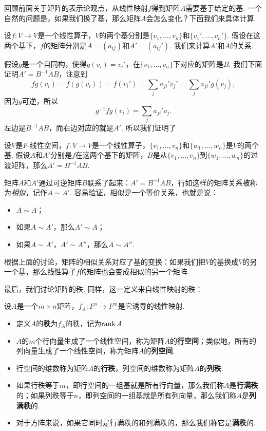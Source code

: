 回顾前面关于矩阵的表示论观点，从线性映射$f$得到矩阵$A$需要基于给定的基. 一个自然的问题是，如果我们换了基，那么矩阵$A$会怎么变化？下面我们来具体计算. 

设$f:V\to V$是一个线性算子，$V$的两个基分别是$\{v_1,\dots,v_n\}$和$\{v_1',\dots,v_n'\}$. 假设在这两个基下，$f$的矩阵分别是$A=(a_{ij})$和$A'=(a_{ij}')$. 我们来计算$A'$和$A$的关系. 

假设$g$是一个自同构，使得$g(v_i)=v_i'$，在$\{v_1,\dots,v_n\}$下对应的矩阵是$B$. 我们下面证明$A'=B^{-1}AB$，注意到
\[fg(v_i)=f(g(v_i))=f(v_i')=\sum_{j}a_{ji}'v_j'=\sum_{j}a_{ji}'g(v_j),\]
因为$g$可逆，所以
\[g^{-1}fg(v_i)=\sum_{j}a_{ji}'v_j.\]
左边是$B^{-1}AB$，而右边对应的就是$A'$. 所以我们证明了

\begin{theorem}\label{theorem:base-change}
    设$V$是$F$-线性空间，$f:V\to V$是一个线性算子，$\{v_1,\dots,v_n\}$和$\{w_1,\dots,w_n\}$是$V$的两个基. 假设$A$和$A'$分别是$f$在这两个基下的矩阵，$B$是从$\{v_1,\dots,v_n\}$到$\{w_1,\dots,w_n\}$的过渡矩阵，那么$A'=B^{-1}AB$. 
\end{theorem}

矩阵$A$和$A'$通过可逆矩阵$B$联系了起来：$A'=B^{-1}AB$，行如这样的矩阵关系被称为\textit{相似}，记作$A\sim A'$. 容易验证，相似是一个等价关系，也就是说：
\begin{itemize}
    \item $A\sim A$；
    \item 如果$A\sim A'$，那么$A'\sim A$；
    \item 如果$A\sim A'$，$A'\sim A''$，那么$A\sim A''$.
\end{itemize}

根据上面的讨论，矩阵的相似关系对应了基的变换：如果我们把$V$的基换成$V$的另一个基，那么线性算子$f$的矩阵也会变成相似的另一个矩阵. 

最后，我们讨论矩阵的秩. 同样，这一定义来自线性映射的秩：

\begin{definition}
设$A$是一个$m\times n$矩阵，$f_A:F^n\to F^m$是它诱导的线性映射.
\begin{itemize}
    \item 定义$A$的\textbf{秩}为$f_A$的秩，记为$\operatorname*{rank} A$.
    \item $A$的$m$个行向量生成了一个线性空间，称为矩阵$A$的\textbf{行空间}；类似地，所有的列向量生成了一个线性空间，称为矩阵$A$的\textbf{列空间}.
    \item 行空间的维数称为矩阵$A$的\textbf{行秩}，列空间的维数称为矩阵$A$的\textbf{列秩}.
    \item 如果行秩等于$m$，即行空间的一组基就是所有行向量，那么我们称$A$是\textbf{行满秩}的；如果列秩等于$n$，即列空间的一组基就是所有列向量，那么我们称$A$是\textbf{列满秩}的.
    \item  对于方阵来说，如果它同时是行满秩的和列满秩的，那么我们称它是\textbf{满秩}的. 
\end{itemize}
\end{definition}

